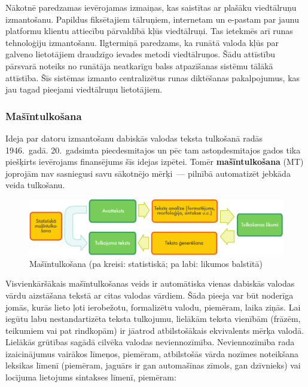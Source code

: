 \begin{multicols}{2}
Nākotnē paredzamas ievērojamas izmaiņas, kas saistītas ar plašāku viedtālruņu izmantošanu.
Papildus fiksētajiem tālruņiem, internetam un e-pastam par jaunu platformu klientu attiecību pārvaldībā kļūs viedtālruņi. 
Tas ietekmēs arī runas tehnoloģiju izmantošanu.
Ilgtermiņā paredzams, ka runātā valoda kļūs par galveno lietotājiem draudzīgo ievades metodi viedtālruņos. 
Šādu attīstību pārsvarā noteiks no runātāja neatkarīgu balss atpazīšanas sistēmu tālākā attīstība.
Šīs sistēmas izmanto centralizētus runas diktēšanas pakalpojumus, kas jau tagad pieejami viedtālruņu lietotājiem. 

\subsubsection{Mašīntulkošana}

Ideja par datoru izmantošanu dabiskās valodas teksta tulkošanā radās 1946.~gadā.
20.~gadsimta piecdesmitajos un pēc tam astoņdesmitajos gados tika piešķirts ievērojams finansējums šīs idejas izpētei.
Tomēr \textbf{mašīntulkošana} (MT) joprojām nav sasniegusi savu sākotnējo \mbox{mērķi}~--- pilnībā automatizēt jebkāda veida tulkošanu.

\begin{figure}[htb]
  \center
  \includegraphics[width=\textwidth]{../_media/latvian/machine_translation}
  \caption{Mašīntulkošana (pa kreisi: statistiskā; pa labi: likumos balstītā)}
  \label{fig:mtarch_de}
\end{figure}


Visvienkāršākais mašīntulkošanas veids ir automātiska vienas dabiskās valodas vārdu aizstāšana tekstā ar citas valodas vārdiem. 
Šāda pieeja var būt noderīga jomās, kurās lieto ļoti ierobežotu, formalizētu valodu, piemēram, laika ziņās.
Lai iegūtu labu nestandartizēta teksta tulkojumu, lielākām teksta vienībām (frāzēm, teikumiem vai pat rindkopām) ir jāatrod atbilstošākais ekvivalents mērķa valodā. Lielākās grūtības sagādā cilvēka valodas neviennozīmība. 
Neviennozīmība rada izaicinājumus vairākos līmeņos, piemēram, atbilstošās vārda nozīmes noteikšana leksikas līmenī (piemēram, jaguārs ir gan automašīnas zīmols, gan dzīvnieks) vai locījuma lietojums sintakses līmenī, piemēram:


\end{multicols}
